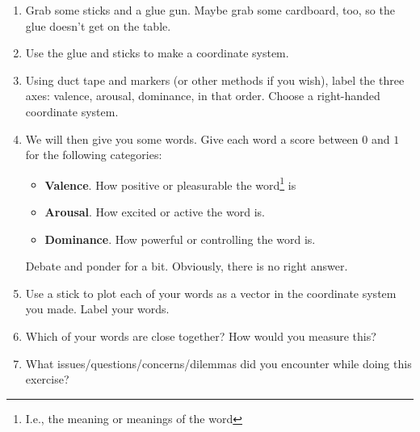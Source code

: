\documentclass[12pt]{article}
\begin{document}
\begin{enumerate}

\item Grab some sticks and a glue gun.  Maybe grab some cardboard,
  too, so the glue doesn't get on the table.

\item Use the glue and sticks to make a coordinate system.

\item Using duct tape and markers (or other methods if you wish),
  label the three axes: valence, arousal, dominance, in that
  order. Choose a right-handed coordinate system.

\item We will then give you some words. Give each word a score between
  $0$ and $1$ for the following categories:
  \begin{itemize}
    \item {\bf Valence}. How positive or
      pleasurable the word\footnote{I.e., the meaning or meanings of
        the word} is
    \item {\bf Arousal}. How excited or active the word is.
    \item {\bf Dominance}. How powerful or controlling the word is.
  \end{itemize}
  Debate and ponder for a bit. Obviously, there is no right answer.

\item Use a stick to plot each of your words as a vector in the
  coordinate system you made. Label your words. 
  
\item Which of your words are close together? How would you measure
  this?

\item What issues/questions/concerns/dilemmas did you encounter while
  doing this exercise? 



\end{enumerate}
\end{document}
